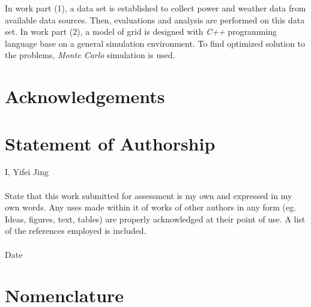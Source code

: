 \documentclass[12pt,a4paper]{report}
\begin{document}
        In work part (1), a data set is established to collect power and weather data from available data sources. Then, evaluations and analysis are performed on this data set.
        In work part (2), a model of grid is designed with \emph{C++} programming language base on a general simulation environment. To find optimized solution to the problems, \emph{Monte Carlo} simulation is used.

        
    \chapter*{Acknowledgements}
    
    \chapter*{Statement of Authorship}

        I, Yifei Jing \\ \\ 
        State that this work submitted for assessment is my own and expressed in my own words.
        Any uses made within it of works of other authors in any form (eg. Ideas, figures, text, tables)
        are properly acknowledged at their point of use. A list of the references employed is included.
        \\ \\Date 
    \chapter*{Nomenclature}
\end{document}
